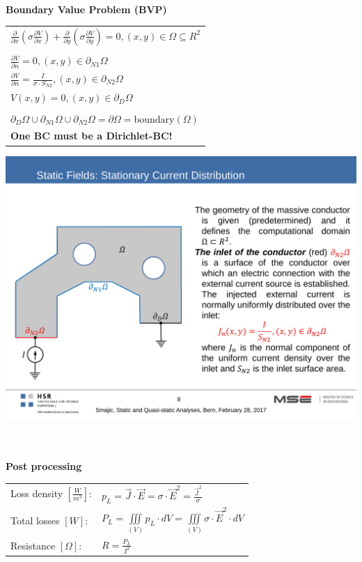 \textbf{\\ Boundary Value Problem (BVP)\\}
\begin{minipage}[lt]{11cm}
	\begin{tabular}{l}
		\(\displaystyle \frac{\partial}{\partial x}\left(\sigma \frac{\partial V}{\partial x}\right) +\frac{\partial}{\partial y}\left(\sigma \frac{\partial V}{\partial y}\right)
		= 0, \left(x,y\right) \in \Omega \subseteq R^2 \) \\ \\
		\(\displaystyle \frac{\partial V}{\partial n} = 0, \left(x,y\right) \in \partial_{N1} \Omega\) \\
		\(\displaystyle \frac{\partial V}{\partial n} = \frac{I}{\sigma \cdot S_{N2}}, \left(x,y\right) \in \partial_{N2} \Omega\) \\
		\(\displaystyle V\left(x,y\right) = 0, \left(x,y\right) \in \partial_D \Omega\)\\ \\
		
		\(\displaystyle \partial_D\Omega\cup\partial_{N1}\Omega\cup\partial_{N2}\Omega = \partial\Omega = \textrm{boundary}(\Omega) \)\\
		\textbf{One BC must be a Dirichlet-BC!}
	\end{tabular}
\end{minipage}
\begin{minipage}[rt]{8cm}
	\includegraphics[width=.8\textwidth]{./images/CurrentDistribution.pdf}
\end{minipage}

\textbf{\\ \\ Post processing \\ }
\begin{tabular}{ll}
	Loss density $\left[\frac{W}{m^3}\right]$: & \(\displaystyle p_L = \vec{J} \cdot \vec{E} = \sigma \cdot \vec{E}^2 = \frac{\vec{J}^2}{\sigma} \)\\
	Total losses $[W]$: & \(\displaystyle P_L = \iiint\limits_{\left(V\right)} p_L \cdot dV = \iiint\limits_{\left(V\right)} \sigma \cdot \vec{E}^2 \cdot dV \) \\
	Resistance $[\Omega]$: & \(\displaystyle R = \frac{P_L}{I^2}\) \\
\end{tabular}